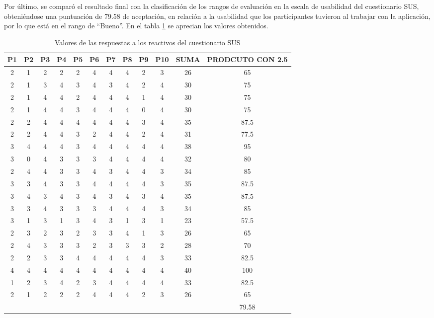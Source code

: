 \documentclass{article}
\begin{document}
Por último, se comparó el resultado final con la clasificación de los rangos de evaluación 
en la escala de usabilidad del cuestionario SUS, obteniéndose una puntuación de 79.58 de 
aceptación, en relación a la usabilidad que los participantes tuvieron al trabajar con la 
aplicación, por lo que está en el rango de “Bueno”. En el tabla \ref{tab:pruebas02} se aprecian los valores 
obtenidos.

\begin{table}[H]
\caption{Valores de las respuestas a los reactivos del cuestionario SUS}
\centering
\begin{tabular}{|c|c|c|c|c|c|c|c|c|c|c|c|}
\hline
P1 & P2 & P3 & P4 & P5 & P6 & P7 & P8 & P9 & P10 & SUMA & PRODCUTO CON 2.5\\ \hline
2 & 1 & 2 & 2 & 2 & 4 & 4 & 4 & 2 & 3 & 26 & 65\\ \hline
2 & 1 & 3 & 4 & 3 & 4 & 3 & 4 & 2 & 4 & 30 & 75\\ \hline
2 & 1 & 4 & 4 & 2 & 4 & 4 & 4 & 1 & 4 & 30 & 75\\ \hline
2 & 1 & 4 & 4 & 3 & 4 & 4 & 4 & 0 & 4 & 30 & 75\\ \hline
2 & 2 & 4 & 4 & 4 & 4 & 4 & 4 & 3 & 4 & 35 & 87.5\\ \hline
2 & 2 & 4 & 4 & 3 & 2 & 4 & 4 & 2 & 4 & 31 & 77.5\\ \hline
3 & 4 & 4 & 4 & 3 & 4 & 4 & 4 & 4 & 4 & 38 & 95\\ \hline
3 & 0 & 4 & 3 & 3 & 3 & 4 & 4 & 4 & 4 & 32 & 80\\ \hline
2 & 4 & 4 & 3 & 3 & 4 & 3 & 4 & 4 & 3 & 34 & 85\\ \hline
3 & 3 & 4 & 3 & 3 & 4 & 4 & 4 & 4 & 3 & 35 & 87.5\\ \hline
3 & 4 & 3 & 4 & 3 & 4 & 3 & 4 & 3 & 4 & 35 & 87.5\\ \hline
3 & 3 & 4 & 3 & 3 & 3 & 4 & 4 & 4 & 3 & 34 & 85\\ \hline
3 & 1 & 3 & 1 & 3 & 4 & 3 & 1 & 3 & 1 & 23 & 57.5\\ \hline
2 & 3 & 2 & 3 & 2 & 3 & 3 & 4 & 1 & 3 & 26 & 65\\ \hline
2 & 4 & 3 & 3 & 3 & 2 & 3 & 3 & 3 & 2 & 28 & 70\\ \hline
2 & 2 & 3 & 3 & 4 & 4 & 4 & 4 & 4 & 3 & 33 & 82.5\\ \hline
4 & 4 & 4 & 4 & 4 & 4 & 4 & 4 & 4 & 4 & 40 & 100\\ \hline
1 & 2 & 3 & 4 & 2 & 3 & 4 & 4 & 4 & 4 & 33 & 82.5\\ \hline
2 & 1 & 2 & 2 & 2 & 4 & 4 & 4 & 2 & 3 & 26 & 65\\ \hline
  &   &   &   &   &   &   &   &   &   &    & 79.58\\ \hline
\end{tabular}

\label{tab:pruebas02}
\end{table}
\end{document}
